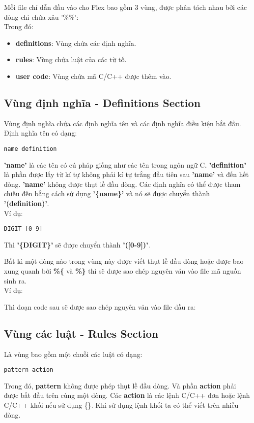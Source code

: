 \documentclass[../report.tex]{subfiles}
\begin{document}
Mỗi file chỉ dẫn đầu vào cho Flex bao gồm 3 vùng, được phân tách nhau 
bởi các dòng chỉ chứa xâu '\%\%': \cite{flex-manual} \\


\noindent Trong đó: 
\begin{itemize}
\item \textbf{definitions}: Vùng chứa các định nghĩa. 
\item \textbf{rules}: Vùng chứa luật của các từ tố. 
\item \textbf{user code}: Vùng chứa mã C/C++ được thêm vào.
\end{itemize}

\subsection{Vùng định nghĩa - Definitions Section}
Vùng định nghĩa chứa các định nghĩa tên và các định nghĩa điều kiện bắt đầu.
Định nghĩa tên có dạng:
\begin{lstlisting}
name definition
\end{lstlisting}
\textbf{'name'} là các tên có cú pháp giống như các tên trong ngôn ngữ C.
\textbf{'definition'} là phần được lấy từ kí tự không phải kí tự trắng đầu tiên 
sau \textbf{'name'} và đến hết dòng. 
\textbf{'name'} không được thụt lề đầu dòng. 
Các định nghĩa có thể được tham chiếu đến bằng cách sử dụng \textbf{'\{name\}'} 
và nó sẽ được chuyển thành \textbf{'(definition)'}. \\
Ví dụ: 
\begin{lstlisting}
DIGIT [0-9]
\end{lstlisting}
Thì \textbf{'\{DIGIT\}'} sẽ được chuyển thành \textbf{'([0-9])'}.

Bất kì một dòng nào trong vùng này được viết thụt lề đầu dòng hoặc 
được bao xung quanh bởi \textbf{\%\{} và \textbf{\%\}} thì sẽ được sao chép nguyên văn 
vào file mã nguồn sinh ra. \\
Ví dụ: 

Thì đoạn code sau sẽ được sao chép nguyên văn vào file đầu ra: 


\subsection{Vùng các luật - Rules Section}
Là vùng bao gồm một chuỗi các luật có dạng:
\begin{lstlisting}
pattern action
\end{lstlisting}
Trong đó, \textbf{pattern} không được phép thụt lề đầu dòng. 
Và phần \textbf{action} phải được bắt đầu trên cùng một dòng. 
Các \textbf{action} là các lệnh C/C++ đơn hoặc lệnh C/C++ khối nếu sử dụng \{\}. Khi sử dụng lệnh khối ta có thể viết trên nhiều dòng.
\end{document}
